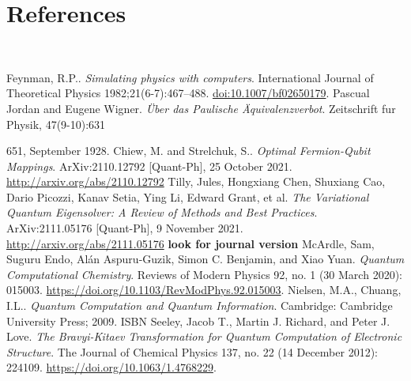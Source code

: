 \documentclass[twoside]{article}
\begin{document}
        \section{References}\\
\begin{thebibliography}{000}
         Feynman, R.P.. {\it Simulating physics with computers}. International Journal of Theoretical Physics 1982;21(6-7):467–488. \url{doi:10.1007/bf02650179}.
         Pascual Jordan and Eugene Wigner. {\it  {\"U}ber das Paulische {\"A}quivalenzverbot}. Zeitschrift fur Physik, 47(9-10):631{651, September 1928.
                 Chiew, M. and Strelchuk, S.. {\it Optimal Fermion-Qubit Mappings}. ArXiv:2110.12792 [Quant-Ph], 25 October 2021. \url{http://arxiv.org/abs/2110.12792}
                Tilly, Jules, Hongxiang Chen, Shuxiang Cao, Dario Picozzi, Kanav Setia, Ying Li, Edward Grant, et al. {\it The Variational Quantum Eigensolver: A Review of Methods and Best Practices}. ArXiv:2111.05176 [Quant-Ph], 9 November 2021. \url{http://arxiv.org/abs/2111.05176} \textbf{look for journal version}
                 McArdle, Sam, Suguru Endo, Alán Aspuru-Guzik, Simon C. Benjamin, and Xiao Yuan. {\it Quantum Computational Chemistry}. Reviews of Modern Physics 92, no. 1 (30 March 2020): 015003. \url{https://doi.org/10.1103/RevModPhys.92.015003}.
                 Nielsen, M.A., Chuang, I.L.. {\it Quantum Computation and Quantum Information}. Cambridge: Cambridge University Press; 2009. ISBN
                 Seeley, Jacob T., Martin J. Richard, and Peter J. Love. {\it The Bravyi-Kitaev Transformation for Quantum Computation of Electronic Structure}. The Journal of Chemical Physics 137, no. 22 (14 December 2012): 224109. \url{https://doi.org/10.1063/1.4768229}.

}
\end{thebibliography}
\end{document}

